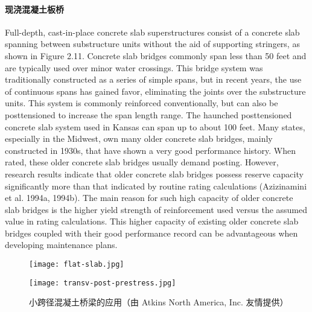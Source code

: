 \paragraph{现浇混凝土板桥}

Full-depth, cast-in-place concrete slab superstructures consist of a concrete slab spanning between substructure units without the aid of supporting stringers, as shown in Figure 2.11. Concrete slab bridges commonly span less than 50 feet and are typically used over minor water crossings. This bridge system was traditionally constructed as a series of simple spans, but in recent years, the use of continuous spans has gained favor, eliminating the joints over the substructure units. This system is commonly reinforced conventionally, but can also be posttensioned to increase the span length range. The haunched posttensioned concrete slab system used in Kansas can span up to about 100 feet. Many states, especially in the Midwest, own many older concrete slab bridges, mainly constructed in 1930s, that have shown a very good performance history. When rated, these older concrete slab bridges usually demand posting. However, research results indicate that older concrete slab bridges possess reserve capacity significantly more than that indicated by routine rating calculations (Azizinamini et al. 1994a, 1994b). The main reason for such high capacity of older concrete slab bridges is the higher yield strength of reinforcement used versus the assumed value in rating calculations. This higher capacity of existing older concrete slab bridges coupled with their good performance record can be advantageous when developing maintenance plans.

\begin{figure}
  \begin{minipage}{0.49\linewidth}\centering
    \texttt{[image: flat-slab.jpg]}
  \end{minipage}\hfill
  \begin{minipage}{0.49\linewidth}\centering
    \texttt{[image: transv-post-prestress.jpg]}
  \end{minipage}
  \caption{小跨径混凝土桥梁的应用（由 Atkins North America, Inc. 友情提供）}
  \label{fig:short-span-concrete-bridge-applications}
\end{figure}

